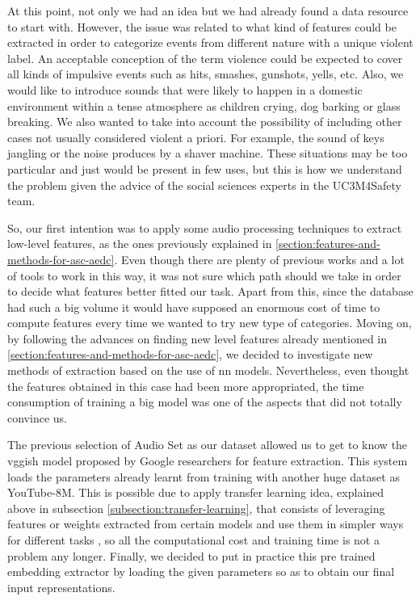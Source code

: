 	At this point, not only we had an idea but we had already found a data resource to start with. However, the issue was related to what kind of features could be extracted in order to categorize events from different nature with a unique violent label. An acceptable conception of the term violence could be expected to cover all kinds of impulsive events such as hits, smashes, gunshots, yells, etc. Also, we would like to introduce sounds that were likely to happen in a domestic environment within a tense atmosphere as children crying, dog barking or glass breaking. We also wanted to take into account the possibility of including other cases not usually considered violent a priori. For example, the sound of keys jangling or the noise produces by a shaver machine. These situations may be too particular and just would be present in few uses, but this is how we understand the problem given the advice of the social sciences experts in the UC3M4Safety team.

	So, our first intention was to apply some audio processing techniques to extract low-level features, as the ones previously explained in \ref{section:features-and-methods-for-asc-aedc}. Even though there are plenty of previous works and a lot of tools to work in this way, it was not sure which path should we take in order to decide what features better fitted our task. Apart from this, since the database had such a big volume it would have supposed an enormous cost of time to compute features every time we wanted to try new type of categories. Moving on, by following the advances on finding new level features already mentioned in \ref{section:features-and-methods-for-asc-aedc}, we decided to investigate new methods of extraction based on the use of \acrlong{nn} models. Nevertheless, even thought the features obtained in this case had been more appropriated, the time consumption of training a big model was one of the aspects that did not totally convince us.

	The previous selection of Audio Set as our dataset allowed us to get to know the \acrshort{vgg}ish model proposed by Google researchers for feature extraction. This system loads the parameters already learnt from training with another huge dataset as YouTube-8M. This is possible due to apply transfer learning idea, explained above in subsection \ref{subsection:transfer-learning}, that consists of leveraging features or weights extracted from certain models and use them in simpler ways for different tasks \cite{Sarkar2018}, so all the computational cost and training time is not a problem any longer. Finally, we decided to put in practice this pre trained embedding extractor by loading the given parameters so as to obtain our final input representations.

